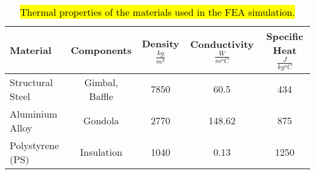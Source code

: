 
\begin{center}
\begin{table}[H]
\centering
  \begin{tabular}{ | l | c | c | c | c | }
    \hline
    \textbf{Material} & \textbf{Components} & \textbf{Density $ \frac{kg}{m^3} $ } & \textbf{Conductivity $ \frac{W}{m ^oC} $} & \textbf{Specific Heat $ \frac{J}{kg ^oC} $} \\ \hline
    Structural Steel  & Gimbal, Baffle & 7850 & 60.5 & 434\\ \hline
    Aluminium Alloy  & Gondola & 2770 & 148.62 & 875\\ \hline
    Polystyrene (PS)  & Insulation & 1040 & 0.13 & 1250\\ \hline
  \end{tabular}
\caption{\hl{Thermal properties of the materials used in the FEA simulation.}}
\end{table}
\label{tab: thermal materials}
\end{center}